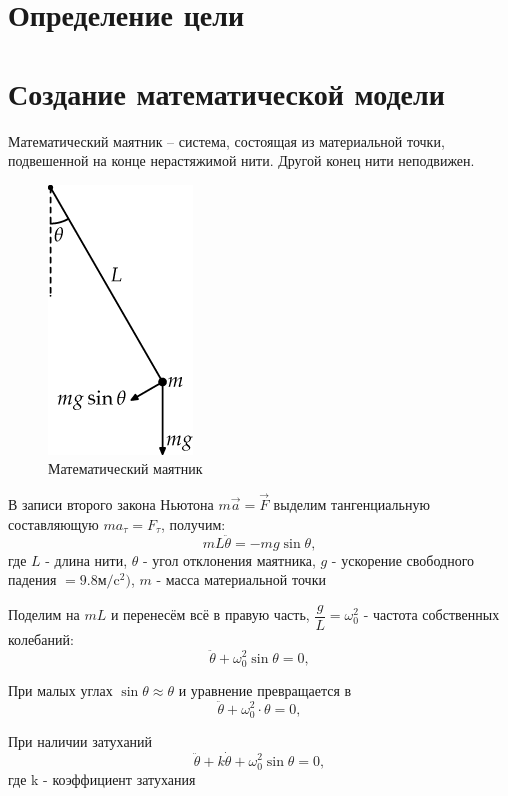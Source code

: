 \documentclass[a4paper, 14pt]{extarticle}
\begin{document}
	\pagebreak	

	\section{Определение цели}
		
	\section{Создание математической модели}
		Математический маятник -- система, состоящая из материальной точки, подвешенной на конце нерастяжимой
		нити. Другой конец нити неподвижен.
		\begin{figure}[H]
			\centering
			\includegraphics[]{fig1.png}
			\caption[.] {Математический маятник}
		\end{figure}
	
		В записи второго закона Ньютона \(m\vec{a} = \vec{F}\) выделим тангенциальную составляющую
		\(ma_\tau = F_\tau\), получим:
			\[ mL\ddot{\theta} = -mg\sin{\theta}, \]
		где $L$ - длина нити, $\theta$ - угол отклонения маятника, $g$ - ускорение свободного падения 
		$ = 9.8 \text{м/}\text{c}^2)$, $m$ - масса материальной точки
		
		Поделим на $mL$ и перенесём всё в правую часть, \(\dfrac{g}{L} = \omega_0^2 \) - частота собственных
		колебаний:
		\[ \ddot{\theta} + \omega_0^2\sin{\theta} = 0, \]
		
		При малых углах \( \sin{\theta} \approx \theta \) и уравнение превращается в
		\[ \ddot{\theta} + \omega_0^2 \cdot \theta = 0, \]
		
		При наличии затуханий
		\[ \ddot{\theta} + k \dot{\theta} + \omega_0^2\sin{\theta} = 0, \]
		где k - коэффициент затухания
	
	\pagebreak
\end{document}
